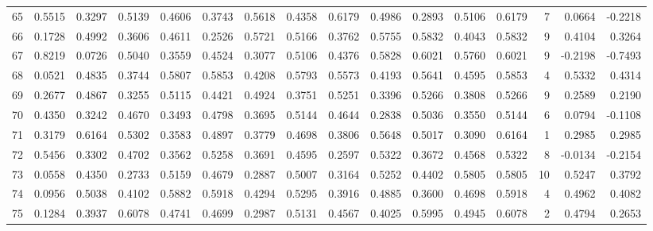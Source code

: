 \begin{tabular}{lrrrrrrrrrrrrrrr}
65  &      0.5515 &  0.3297 &  0.5139 &  0.4606 &  0.3743 &  0.5618 &  0.4358 &  0.6179 &  0.4986 &  0.2893 &   0.5106 &     0.6179 &      7 &                    0.0664 &                    -0.2218 \\
66  &      0.1728 &  0.4992 &  0.3606 &  0.4611 &  0.2526 &  0.5721 &  0.5166 &  0.3762 &  0.5755 &  0.5832 &   0.4043 &     0.5832 &      9 &                    0.4104 &                     0.3264 \\
67  &      0.8219 &  0.0726 &  0.5040 &  0.3559 &  0.4524 &  0.3077 &  0.5106 &  0.4376 &  0.5828 &  0.6021 &   0.5760 &     0.6021 &      9 &                   -0.2198 &                    -0.7493 \\
68  &      0.0521 &  0.4835 &  0.3744 &  0.5807 &  0.5853 &  0.4208 &  0.5793 &  0.5573 &  0.4193 &  0.5641 &   0.4595 &     0.5853 &      4 &                    0.5332 &                     0.4314 \\
69  &      0.2677 &  0.4867 &  0.3255 &  0.5115 &  0.4421 &  0.4924 &  0.3751 &  0.5251 &  0.3396 &  0.5266 &   0.3808 &     0.5266 &      9 &                    0.2589 &                     0.2190 \\
70  &      0.4350 &  0.3242 &  0.4670 &  0.3493 &  0.4798 &  0.3695 &  0.5144 &  0.4644 &  0.2838 &  0.5036 &   0.3550 &     0.5144 &      6 &                    0.0794 &                    -0.1108 \\
71  &      0.3179 &  0.6164 &  0.5302 &  0.3583 &  0.4897 &  0.3779 &  0.4698 &  0.3806 &  0.5648 &  0.5017 &   0.3090 &     0.6164 &      1 &                    0.2985 &                     0.2985 \\
72  &      0.5456 &  0.3302 &  0.4702 &  0.3562 &  0.5258 &  0.3691 &  0.4595 &  0.2597 &  0.5322 &  0.3672 &   0.4568 &     0.5322 &      8 &                   -0.0134 &                    -0.2154 \\
73  &      0.0558 &  0.4350 &  0.2733 &  0.5159 &  0.4679 &  0.2887 &  0.5007 &  0.3164 &  0.5252 &  0.4402 &   0.5805 &     0.5805 &     10 &                    0.5247 &                     0.3792 \\
74  &      0.0956 &  0.5038 &  0.4102 &  0.5882 &  0.5918 &  0.4294 &  0.5295 &  0.3916 &  0.4885 &  0.3600 &   0.4698 &     0.5918 &      4 &                    0.4962 &                     0.4082 \\
75  &      0.1284 &  0.3937 &  0.6078 &  0.4741 &  0.4699 &  0.2987 &  0.5131 &  0.4567 &  0.4025 &  0.5995 &   0.4945 &     0.6078 &      2 &                    0.4794 &                     0.2653 \\

\end{tabular}
